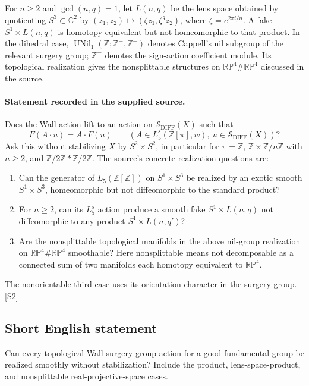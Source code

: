 \documentclass[11pt]{article}
\newcommand{\sref}[2]{\hyperlink{source:#1:#2}{[S#2]}}
\begin{document}
For $n\ge2$ and $\gcd(n,q)=1$, let $L(n,q)$ be the lens space obtained by quotienting $S^3\subset\mathbb C^2$ by $(z_1,z_2)\mapsto(\zeta z_1,\zeta^qz_2)$, where $\zeta=e^{2\pi i/n}$. A fake $S^1\times L(n,q)$ is homotopy equivalent but not homeomorphic to that product. In the dihedral case, $\operatorname{UNil}_1(\mathbb Z;\mathbb Z^-,\mathbb Z^-)$ denotes Cappell's nil subgroup of the relevant surgery group; $\mathbb Z^-$ denotes the sign-action coefficient module. Its topological realization gives the nonsplittable structures on $\mathbb{RP}^4\#\mathbb{RP}^4$ discussed in the source.
\paragraph{Statement recorded in the supplied source.}
Does the Wall action lift to an action on $\mathcal S_{\mathrm{DIFF}}(X)$ such that
\[
F(A\cdot u)=A\cdot F(u)\qquad
(A\in L_5^s(\mathbb Z[\pi],w),\ u\in\mathcal S_{\mathrm{DIFF}}(X))?
\]
Ask this without stabilizing $X$ by $S^2\times S^2$, in particular for $\pi=\mathbb Z$, $\mathbb Z\times\mathbb Z/n\mathbb Z$ with $n\ge2$, and $\mathbb Z/2\mathbb Z*\mathbb Z/2\mathbb Z$. The source's concrete realization questions are:
\begin{enumerate}
\item[(i)] Can the generator of $L_5(\mathbb Z[\mathbb Z])$ on $S^1\times S^3$ be realized by an exotic smooth $S^1\times S^3$, homeomorphic but not diffeomorphic to the standard product?
\item[(ii)] For $n\ge2$, can its $L_5^s$ action produce a smooth fake $S^1\times L(n,q)$ not diffeomorphic to any product $S^1\times L(n,q')$?
\item[(iii)] Are the nonsplittable topological manifolds in the above nil-group realization on $\mathbb{RP}^4\#\mathbb{RP}^4$ smoothable? Here nonsplittable means not decomposable as a connected sum of two manifolds each homotopy equivalent to $\mathbb{RP}^4$.
\end{enumerate}
The nonorientable third case uses its orientation character in the surgery group. \sref{statement}{2}
\subsection{Short English statement}
Can every topological Wall surgery-group action for a good fundamental group be realized smoothly without stabilization? Include the product, lens-space-product, and nonsplittable real-projective-space cases.
\end{document}
